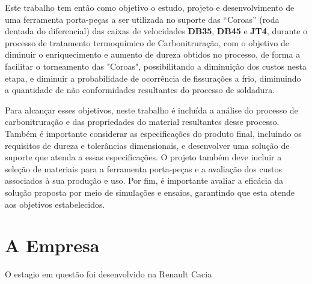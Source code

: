 Este trabalho tem então como objetivo o estudo, projeto e desenvolvimento de uma ferramenta porta-peças a ser utilizada no suporte das “Coroas” (roda dentada do diferencial) das caixas de velocidades \textbf{DB35}, \textbf{DB45} e \textbf{JT4}, durante o processo de tratamento termoquímico de Carbonitruração, com o objetivo de diminuir o enriquecimento e aumento de dureza obtidos no processo, de forma a facilitar o torneamento das "Coroas", possibilitando a diminuição dos custos nesta etapa, e diminuir a probabilidade de ocorrência de fissurações a frio, diminuindo a quantidade de não conformidades resultantes do processo de soldadura.
\par
\newpage
Para alcançar esses objetivos, neste trabalho é incluída a análise do processo de carbonitruração e das propriedades do material resultantes desse processo. Também é importante considerar as especificações do produto final, incluindo os requisitos de dureza e tolerâncias dimensionais, e desenvolver uma solução de suporte que atenda a essas especificações. O projeto também deve incluir a seleção de materiais para a ferramenta porta-peças e a avaliação dos custos associados à sua produção e uso. Por fim, é importante avaliar a eficácia da solução proposta por meio de simulações e ensaios, garantindo que esta atende aos objetivos estabelecidos.
\section{A Empresa} \label{s:intro_empresa}
O estagio em questão foi desenvolvido na Renault Cacia

